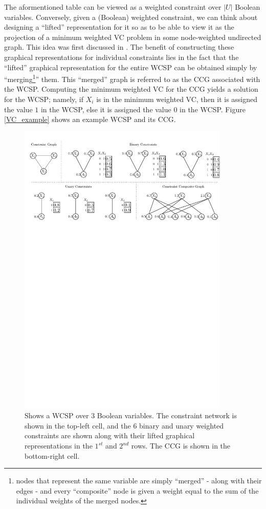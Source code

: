   The aformentioned table can be viewed as a weighted constraint over $|U|$ Boolean variables. Conversely, given a (Boolean) weighted constraint, we can think about designing a ``lifted'' representation for it so as to be able to view it as the projection of a minimum weighted VC problem in some node-weighted undirected graph. This idea was first discussed in \cite{K:ISAIM:08}. The benefit of constructing these graphical representations for individual constraints lies in the fact that the ``lifted'' graphical representation for the entire WCSP can be obtained simply by ``merging\footnote{nodes that represent the same variable are simply ``merged'' - along with their edges - and every ``composite'' node is given a weight equal to the sum of the individual weights of the merged nodes.}'' them. This ``merged'' graph is referred to as the CCG associated with the WCSP. Computing the minimum weighted VC for the CCG yields a solution for the WCSP; namely, if $X_i$ is in the minimum weighted VC, then it is assigned the value $1$ in the WCSP, else it is assigned the value $0$ in the WCSP. Figure \ref{VC_example} shows an example WCSP and its CCG.
  
\begin{figure}[t]
  \centering
  \includegraphics[width=0.9\textwidth]{figs/fig7}
  \caption{Shows a WCSP over $3$ Boolean variables. The constraint network is shown in the top-left cell, and the $6$ binary and unary weighted constraints are shown along with their lifted graphical representations in the $1^{st}$ and $2^{nd}$ rows. The CCG is shown in the bottom-right cell.}
  \label{ccg_example}
\end{figure}

